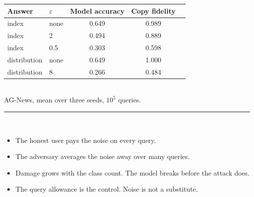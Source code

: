 \documentclass[aspectratio=169,11pt]{beamer}
\newcommand{\redline}{\textcolor{kred}{\rule{\textwidth}{1pt}}}
\begin{document}
\begin{frame}
  \begin{center}
  \footnotesize
  \begin{tabular}{llccc}
    \toprule
    Answer & $\varepsilon$ & Model accuracy & Copy fidelity \\
    \midrule
    index        & none & 0.649 & 0.989 \\
    index        & 2    & 0.494 & 0.889 \\
    index        & 0.5  & 0.303 & 0.598 \\
    \midrule
    distribution & none & 0.649 & \alert{1.000} \\
    distribution & 8    & 0.266 & 0.484 \\
    \bottomrule
  \end{tabular}\\[0.3em]
  \tiny AG-News, mean over three seeds, $10^5$ queries.
  \end{center}
  \vspace{0.4em}
  \redline\\[0.6em]
  \begin{itemize}
    \item The honest user pays the noise on every query.
    \item The adversary averages the noise away over many queries.
    \item Damage grows with the class count. The model breaks before the attack does.
    \item \alert{The query allowance is the control. Noise is not a substitute.}
  \end{itemize}
\end{frame}
\end{document}

